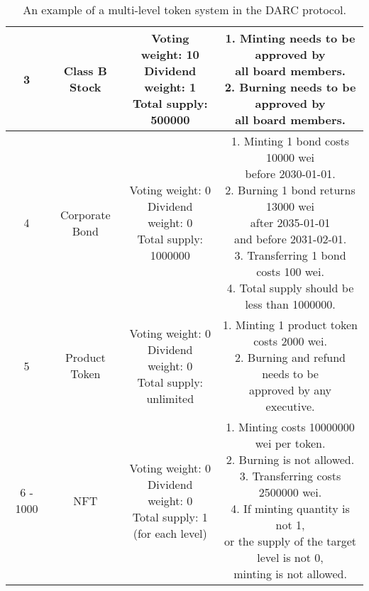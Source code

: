 \documentclass[main.tex]{subfiles}
\begin{document}
\begin{table}[h!]
\begin{tabular}{| c | c | c| c |}
    \hline
    3 & Class B Stock & \makecell[l]{Voting weight: 10 \\ Dividend weight: 1 \\ Total supply: 500000} & \makecell[l]{1. Minting needs to be approved by \\ all board members. \\ 2. Burning needs to be approved by \\ all board members.} \\
    \hline
    4 & Corporate Bond & \makecell[l]{Voting weight: 0 \\ Dividend weight: 0 \\ Total supply: 1000000} & \makecell[l]{1. Minting 1 bond costs 10000 wei \\  before 2030-01-01. \\ 2. Burning 1 bond returns 13000 wei \\ after 2035-01-01 \\ and before 2031-02-01. \\ 3. Transferring 1 bond costs 100 wei. \\ 4. Total supply should be less than 1000000.} \\
    \hline 
    5 & Product Token & \makecell[l]{Voting weight: 0 \\ Dividend weight: 0 \\ Total supply: unlimited} & \makecell[l]{1. Minting 1 product token costs 2000 wei. \\ 2. Burning and refund needs to be  \\ approved by any executive.} \\
    \hline
    6 - 1000 & NFT & \makecell[l]{Voting weight: 0 \\ Dividend weight: 0 \\ Total supply: 1\\(for each level)} & \makecell[l]{1. Minting costs 10000000 wei per token. \\ 2. Burning is not allowed. \\ 3. Transferring costs 2500000 wei. \\ 4. If minting quantity is not 1, \\ or the supply of the target level is not 0, \\ minting is not allowed.} \\
    \hline
    \end{tabular}
    \caption{An example of a multi-level token system in the DARC protocol.}
    \label{table:6}
    \end{table}
\end{document}

